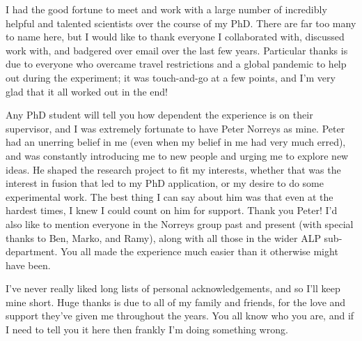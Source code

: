 
I had the good fortune to meet and work with a large number of incredibly helpful and talented scientists over the course of my PhD. There are far too many to name here, but I would like to thank everyone I collaborated with, discussed work with, and badgered over email over the last few years. Particular thanks is due to everyone who overcame travel restrictions and a global pandemic to help out during the experiment; it was touch-and-go at a few points, and I'm very glad that it all worked out in the end!

Any PhD student will tell you how dependent the experience is on their supervisor, and I was extremely fortunate to have Peter Norreys as mine. Peter had an unerring belief in me (even when my belief in me had very much erred), and was constantly introducing me to new people and urging me to explore new ideas. He shaped the research project to fit my interests, whether that was the interest in fusion that led to my PhD application, or my desire to do some experimental work. The best thing I can say about him was that even at the hardest times, I knew I could count on him for support. Thank you Peter! I'd also like to mention everyone in the Norreys group past and present (with special thanks to Ben, Marko, and Ramy), along with all those in the wider ALP sub-department. You all made the experience much easier than it otherwise might have been.

I've never really liked long lists of personal acknowledgements, and so I'll keep mine short. Huge thanks is due to all of my family and friends, for the love and support they've given me throughout the years. You all know who you are, and if I need to tell you it here then frankly I'm doing something wrong.




